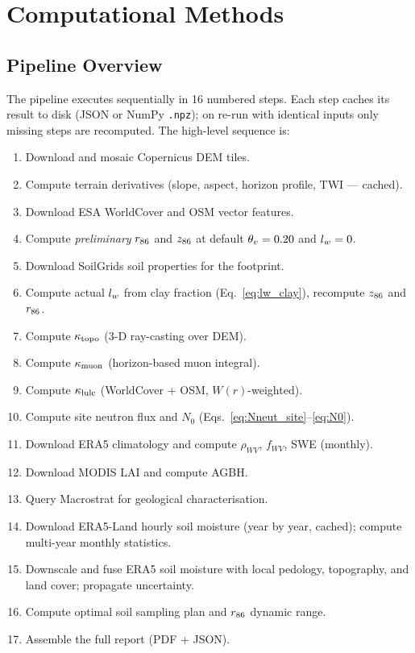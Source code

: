 \section{Computational Methods}
\label{sec:methods}

\subsection{Pipeline Overview}

The pipeline executes sequentially in 16 numbered steps.
Each step caches its result to disk (JSON or NumPy \texttt{.npz});
on re-run with identical inputs only missing steps are recomputed.
The high-level sequence is:

\begin{enumerate}[nosep]
  \item Download and mosaic Copernicus DEM tiles.
  \item Compute terrain derivatives (slope, aspect, horizon profile,
        TWI — cached).
  \item Download ESA WorldCover and OSM vector features.
  \item Compute \emph{preliminary} $r_{86}$ and $z_{86}$ at default
        $\theta_v = 0.20$ and $l_w = 0$.
  \item Download SoilGrids soil properties for the footprint.
  \item Compute actual $l_w$ from clay fraction (Eq.~\eqref{eq:lw_clay}),
        recompute $z_{86}$ and $r_{86}$.
  \item Compute $\kappa_\mathrm{topo}$ (3-D ray-casting over DEM).
  \item Compute $\kappa_\mathrm{muon}$ (horizon-based muon integral).
  \item Compute $\kappa_\mathrm{lulc}$ (WorldCover + OSM, $W(r)$-weighted).
  \item Compute site neutron flux and $N_0$
        (Eqs.~\eqref{eq:Nneut_site}--\eqref{eq:N0}).
  \item Download ERA5 climatology and compute
        $\rho_{WV}$, $f_{WV}$, SWE (monthly).
  \item Download MODIS LAI and compute AGBH.
  \item Query Macrostrat for geological characterisation.
  \item Download ERA5-Land hourly soil moisture (year by year,
        cached); compute multi-year monthly statistics.
  \item Downscale and fuse ERA5 soil moisture with local pedology,
        topography, and land cover; propagate uncertainty.
  \item Compute optimal soil sampling plan and $r_{86}$ dynamic range.
  \item Assemble the full report (PDF + JSON).
\end{enumerate}

